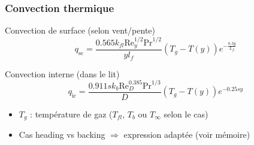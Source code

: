 \documentclass[handout]{beamer}
\newtheorem{pbm et hypo}[thm]{Problématique et hypothèses}
\begin{document}
	\begin{frame}
		\frametitle{Convection thermique \phone}
		
		\begin{block}{Convection de surface (selon vent/pente)}
			\vspace{-1ex}
			\begin{equation}
				q_{\text{sc}}= \frac{0.565k_{fl}\mathrm{Re}_y^{1/2} \mathrm{Pr}^{1/2}}{y l_f}\left(T_{g}-T(y)\right)e^{-\frac{0.3y}{L_{fl}}}
			\end{equation}
		\end{block}
		\vspace{3ex}
		\begin{block}{Convection interne (dans le lit)}
			\vspace{-1ex}
			\begin{equation}
				q_{\text{ic}} = \frac{0.911sk_b \mathrm{Re}_D^{0.385}\mathrm{Pr}^{1/3}}{D}\left(T_g-T(y)\right)e^{-0.25sy}
			\end{equation}
		\end{block}
		\vspace{3ex}
		\begin{itemize}
			\item $T_g$ : température de gaz ($T_{fl}$, $T_b$ ou $T_\infty$ selon le cas)
			\item Cas heading vs backing $\Rightarrow$ expression adaptée (voir mémoire)
		\end{itemize}
	\end{frame}
	
\end{document}
